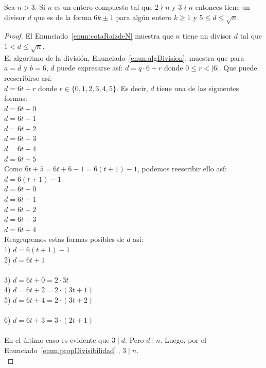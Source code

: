 \begin{enunciado} \label{enun:factor6masmenos1}\leavevmode\par Sea $n > 3$. 
Si $n$ es un entero compuesto tal que $2 \nmid n$ y $3 \nmid n$ entonces tiene un divisor $d$ que es de la forma $6k \pm 1$ para algún entero $k \geq 1$ y $5 \leq d \leq \sqrt{n}$.
\end{enunciado}

\begin{proof} El Enunciado~\ref{enun:cotaRaizdeN} muestra que $n$ tiene un divisor $d$ tal que $1 < d \leq \sqrt{n}$. \\
El algoritmo de la división, Enunciado~\ref{enun:algDivision}, muestra que para $a = d$ y $b = 6$, $d$ puede expresarse así: $d = q \cdot 6 + r$ donde $0 \leq r < |6|$. Que puede reescribirse así: \\
$d = 6t + r$ donde $r \in \{ 0,1,2,3,4,5\}$. Es decir, $d$ tiene una de las siguientes formas: \\
$d = 6t + 0 $ \\
$d = 6t+ 1 $ \\ 
$d = 6t + 2 $ \\ 
$d = 6t + 3 $ \\ 
$d = 6t + 4 $ \\ 
$d = 6t + 5 $ \\
Como $6t + 5 = 6t + 6 - 1 = 6(t+1) - 1$, podemos reescribir ello así: \\
$d = 6(t+1) - 1$ \\
$d = 6t + 0 $ \\
$d = 6t+ 1 $ \\ 
$d = 6t + 2 $ \\ 
$d = 6t + 3 $ \\ 
$d = 6t + 4 $ \\ 
Reagrupemos estas formas posibles de $d$ así: \\
1) $d = 6(t+1) - 1$ \\
2) $d = 6t + 1 $ \\ \\
3) $d = 6t + 0 = 2 \cdot 3 t$ \\
4) $d = 6t + 2 = 2 \cdot (3t +1)$ \\ 
5) $d = 6t + 4 = 2 \cdot (3t +2)$ \\ \\
6) $d = 6t + 3 = 3 \cdot (2t +1)$ \\ \\
\setcounter{enumi}{5}
En el último caso es evidente que $3 \mid d$. Pero $d \mid n$. Luego, por el Enunciado~\ref{enun:propDivisibilidad}., $3 \mid n$. \\

\end{proof}
